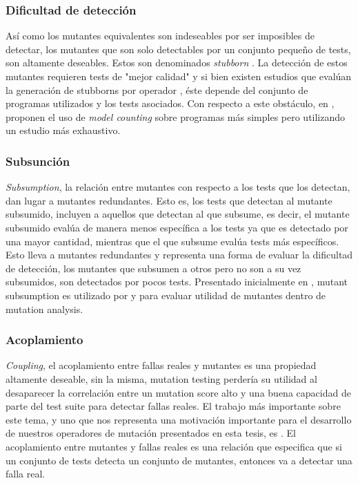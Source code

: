 \subsubsection{Dificultad de detecci\'on}

As\'i como los mutantes equivalentes son indeseables por ser imposibles de detectar, los mutantes que son solo detectables por un conjunto peque\~no de tests, son altamente deseables. Estos son denominados \emph{stubborn} \cite{bibliography.mutation.evaluation.stubbornHieronsHD99}. La detecci\'on de estos mutantes requieren tests de "mejor calidad" y si bien existen estudios que eval\'uan la generaci\'on de stubborns por operador \cite{bibliography.mutation.evaluation.stubborn}, \'este depende del conjunto de programas utilizados y los tests asociados. Con respecto a este obst\'aculo, en \cite{bibliography.mutation.evaluation.hardnessVisser}, proponen el uso de \emph{model counting} sobre programas m\'as simples pero utilizando un estudio m\'as exhaustivo.

\subsubsection{Subsunci\'on}

\emph{Subsumption}, la relaci\'on entre mutantes con respecto a los tests que los detectan, dan lugar a mutantes redundantes. Esto es, los tests que detectan al mutante subsumido, incluyen a aquellos que detectan al que subsume, es decir, el mutante subsumido eval\'ua de manera menos espec\'ifica a los tests ya que es detectado por una mayor cantidad, mientras que el que subsume eval\'ua tests m\'as espec\'ificos. Esto lleva a mutantes redundantes y representa una forma de evaluar la dificultad de detecci\'on, los mutantes que subsumen a otros pero no son a su vez subsumidos, son detectados por pocos tests. Presentado inicialmente en \cite{bibliography.mutation.selection.Offutt96}, mutant subsumption es utilizado por \cite{bibliography.mutation.minimizing.dynamicsubsumption} y \cite{bibliography.mutation.evaluation.JustKA17} para evaluar utilidad de mutantes dentro de mutation analysis.

\subsubsection{Acoplamiento}

\emph{Coupling}, el acoplamiento entre fallas reales y mutantes es una propiedad altamente deseable, sin la misma, mutation testing perder\'ia su utilidad al desaparecer la correlaci\'on entre un mutation score alto y una buena capacidad de parte del test suite para detectar fallas reales. El trabajo m\'as importante sobre este tema, y uno que nos representa una motivaci\'on importante para el desarrollo de nuestros operadores de mutaci\'on presentados en esta tesis, es \cite{bibliography.mutation.evaluation.valid-substitute}. El acoplamiento entre mutantes y fallas reales es una relaci\'on que especifica que si un conjunto de tests detecta un conjunto de mutantes, entonces va a detectar una falla real. 

